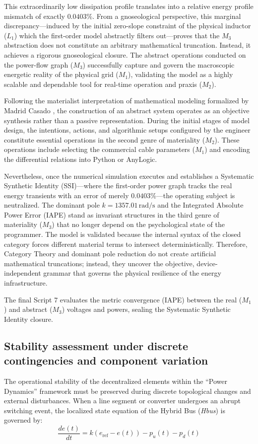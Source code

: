 \documentclass[11pt, a4paper]{article}
\begin{document}
This extraordinarily low dissipation profile translates into a relative energy profile mismatch of exactly $0.0403\%$. From a gnoseological perspective, this marginal discrepancy---induced by the initial zero-slope constraint of the physical inductor ($L_1$) which the first-order model abstractly filters out---proves that the $M_3$ abstraction does not constitute an arbitrary mathematical truncation. Instead, it achieves a rigorous gnoseological closure. The abstract operations conducted on the power-flow graph ($M_3$) successfully capture and govern the macroscopic energetic reality of the physical grid ($M_1$), validating the model as a highly scalable and dependable tool for real-time operation and praxis ($M_2$).

Following the materialist interpretation of mathematical modeling formalized by Madrid Casado \cite{madrid2009porvenir}, the construction of an abstract system operates as an objective synthesis rather than a passive representation. During the initial stages of model design, the intentions, actions, and algorithmic setups configured by the engineer constitute essential operations in the second genre of materiality ($M_2$). These operations include selecting the commercial cable parameters ($M_1$) and encoding the differential relations into Python or AnyLogic.

Nevertheless, once the numerical simulation executes and establishes a Systematic Synthetic Identity (SSI)---where the first-order power graph tracks the real energy transients with an error of merely $0.0403\%$---the operating subject is neutralized. The dominant pole $k = 1357.01\,\text{rad/s}$ and the Integrated Absolute Power Error (IAPE) stand as invariant structures in the third genre of materiality ($M_3$) that no longer depend on the psychological state of the programmer. The model is validated because the internal syntax of the closed category forces different material terms to intersect deterministically. Therefore, Category Theory and dominant pole reduction do not create artificial mathematical truncations; instead, they uncover the objective, device-independent grammar that governs the physical resilience of the energy infrastructure.


The final Script 7 evaluates the metric convergence (IAPE) between the real ($M_1$) and abstract ($M_3$) voltages and powers, sealing the Systematic Synthetic Identity closure.



\subsection{Stability assessment under discrete contingencies and component variation}
The operational stability of the decentralized elements within the ``Power Dynamics'' framework must be preserved during discrete topological changes and external disturbances. When a line segment or converter undergoes an abrupt switching event, the localized state equation of the Hybrid Bus (\textit{Hbus}) is governed by:
\begin{equation}
    \frac{de(t)}{dt} = k(e_{\text{ref}} - e(t)) - p_u(t) - p_d(t)
\end{equation}
\end{document}
